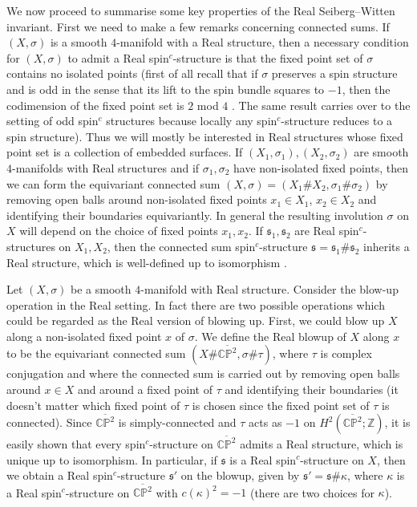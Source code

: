 \documentclass{amsart}
\theoremstyle{definition}
\theoremstyle{remark}
\numberwithin{equation}{section}
\begin{document}
We now proceed to summarise some key properties of the Real Seiberg--Witten invariant. First we need to make a few remarks concerning connected sums. If $(X,\sigma)$ is a smooth $4$-manifold with a Real structure, then a necessary condition for $(X,\sigma)$ to admit a Real spin$^c$-structure is that the fixed point set of $\sigma$ contains no isolated points (first of all recall that if $\sigma$ preserves a spin structure and is odd in the sense that its lift to the spin bundle squares to $-1$, then the codimension of the fixed point set is $2$ mod $4$ \cite[Proposition 8.46]{ab}. The same result carries over to the setting of odd spin$^c$ structures because locally any spin$^c$-structure reduces to a spin structure). Thus we will mostly be interested in Real structures whose fixed point set is a collection of embedded surfaces. If $(X_1 , \sigma_1), (X_2, \sigma_2)$ are smooth $4$-manifolds with Real structures and if $\sigma_1,\sigma_2$ have non-isolated fixed points, then we can form the equivariant connected sum $(X,\sigma) = (X_1 \# X_2 , \sigma_1 \# \sigma_2)$ by removing open balls around non-isolated fixed points $x_1 \in X_1$, $x_2 \in X_2$ and identifying their boundaries equivariantly. In general the resulting involution $\sigma$ on $X$ will depend on the choice of fixed points $x_1,x_2$. If $\mathfrak{s}_1, \mathfrak{s}_2$ are Real spin$^c$-structures on $X_1,X_2$, then the connected sum spin$^c$-structure $\mathfrak{s} = \mathfrak{s}_1 \# \mathfrak{s}_2$ inherits a Real structure, which is well-defined up to isomorphism \cite[]{bar3}.

Let $(X , \sigma)$ be a smooth $4$-manifold with Real structure. Consider the blow-up operation in the Real setting. In fact there are two possible operations which could be regarded as the Real version of blowing up. First, we could blow up $X$ along a non-isolated fixed point $x$ of $\sigma$. We define the Real blowup of $X$ along $x$ to be the equivariant connected sum $(X \# \overline{\mathbb{CP}^2} , \sigma \# \tau)$, where $\tau$ is complex conjugation and where the connected sum is carried out by removing open balls around $x \in X$ and around a fixed point of $\tau$ and identifying their boundaries (it doesn't matter which fixed point of $\tau$ is chosen since the fixed point set of $\tau$ is connected). Since $\overline{\mathbb{CP}^2}$ is simply-connected and $\tau$ acts as $-1$ on $H^2( \overline{\mathbb{CP}^2} ; \mathbb{Z})$, it is easily shown that every spin$^c$-structure on $\overline{\mathbb{CP}^2}$ admits a Real structure, which is unique up to isomorphism. In particular, if $\mathfrak{s}$ is a Real spin$^c$-structure on $X$, then we obtain a Real spin$^c$-structure $\mathfrak{s}'$ on the blowup, given by $\mathfrak{s}' = \mathfrak{s} \# \kappa$, where $\kappa$ is a Real spin$^c$-structure on $\overline{\mathbb{CP}^2}$ with $c(\kappa)^2 = -1$ (there are two choices for $\kappa$). 
\end{document}
